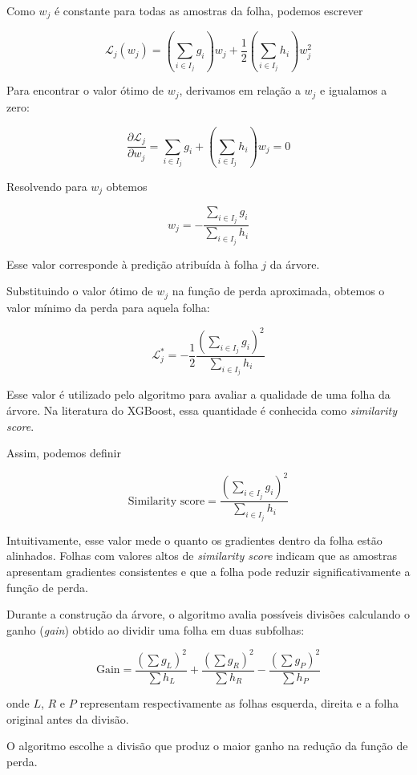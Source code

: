 \documentclass{article}
\begin{document}
Como $w_j$ é constante para todas as amostras da folha, podemos escrever

\begin{equation}
\mathcal{L}_j(w_j) =
\left(\sum_{i \in I_j} g_i\right) w_j +
\frac{1}{2}
\left(\sum_{i \in I_j} h_i\right) w_j^2
\end{equation}

Para encontrar o valor ótimo de $w_j$, derivamos em relação a $w_j$ e
igualamos a zero:

\begin{equation}
\frac{\partial \mathcal{L}_j}{\partial w_j}
=
\sum_{i \in I_j} g_i
+
\left(\sum_{i \in I_j} h_i\right) w_j
= 0
\end{equation}

Resolvendo para $w_j$ obtemos

\begin{equation}
w_j =
-
\frac{\sum_{i \in I_j} g_i}
{\sum_{i \in I_j} h_i}
\end{equation}

Esse valor corresponde à predição atribuída à folha $j$ da árvore.

Substituindo o valor ótimo de $w_j$ na função de perda aproximada,
obtemos o valor mínimo da perda para aquela folha:

\begin{equation}
\mathcal{L}_j^* =
-
\frac{1}{2}
\frac
{\left(\sum_{i \in I_j} g_i\right)^2}
{\sum_{i \in I_j} h_i}
\end{equation}

Esse valor é utilizado pelo algoritmo para avaliar a qualidade de uma
folha da árvore. Na literatura do XGBoost, essa quantidade é conhecida
como \textit{similarity score}.

Assim, podemos definir

\begin{equation}
\text{Similarity score} =
\frac
{\left(\sum_{i \in I_j} g_i\right)^2}
{\sum_{i \in I_j} h_i}
\end{equation}

Intuitivamente, esse valor mede o quanto os gradientes dentro da folha
estão alinhados. Folhas com valores altos de \textit{similarity score}
indicam que as amostras apresentam gradientes consistentes e que a
folha pode reduzir significativamente a função de perda.

Durante a construção da árvore, o algoritmo avalia possíveis divisões
calculando o ganho (\textit{gain}) obtido ao dividir uma folha em duas
subfolhas:

\begin{equation}
\text{Gain} =
\frac
{\left(\sum g_L\right)^2}
{\sum h_L}
+
\frac
{\left(\sum g_R\right)^2}
{\sum h_R}
-
\frac
{\left(\sum g_P\right)^2}
{\sum h_P}
\end{equation}

onde $L$, $R$ e $P$ representam respectivamente as folhas esquerda,
direita e a folha original antes da divisão.

O algoritmo escolhe a divisão que produz o maior ganho na redução
da função de perda.
\end{document}
